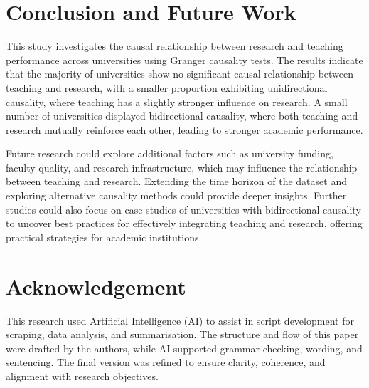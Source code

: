\documentclass[a4paper, conference]{IEEEtran}
\begin{document}
\section{Conclusion and Future Work}
\label{sec:conclusion_and_future_work}

This study investigates the causal relationship between research and teaching performance across universities using Granger causality tests. The results indicate that the majority of universities show no significant causal relationship between teaching and research, with a smaller proportion exhibiting unidirectional causality, where teaching has a slightly stronger influence on research. A small number of universities displayed bidirectional causality, where both teaching and research mutually reinforce each other, leading to stronger academic performance.

Future research could explore additional factors such as university funding, faculty quality, and research infrastructure, which may influence the relationship between teaching and research. Extending the time horizon of the dataset and exploring alternative causality methods could provide deeper insights. Further studies could also focus on case studies of universities with bidirectional causality to uncover best practices for effectively integrating teaching and research, offering practical strategies for academic institutions.


\section*{Acknowledgement}

This research used Artificial Intelligence (AI) to assist in script development for scraping, data analysis, and summarisation. The structure and flow of this paper were drafted by the authors, while AI supported grammar checking, wording, and sentencing. The final version was refined to ensure clarity, coherence, and alignment with research objectives.



\end{document}
